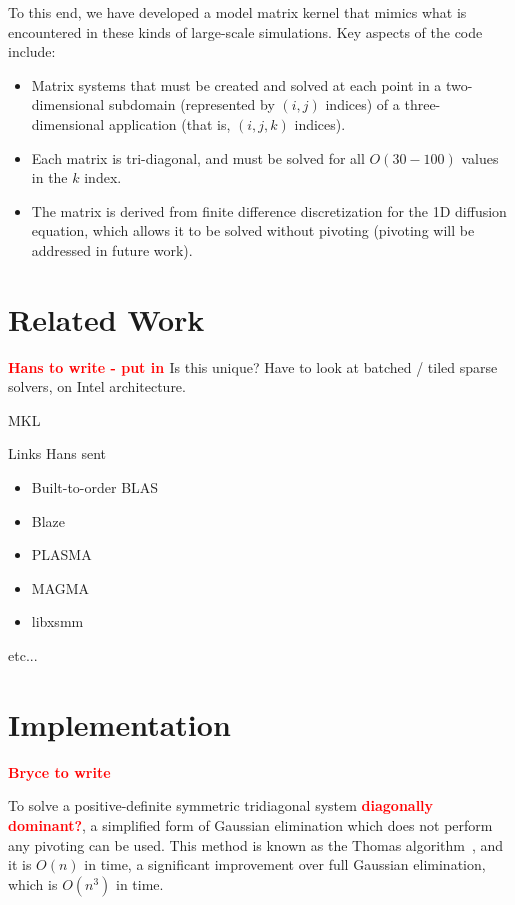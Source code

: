 \documentclass[conference]{IEEEtran}
\newcommand{\fix}[1]{{\bf \textcolor {red}{#1}}}
\begin{document}
To this end, we have developed a model matrix kernel that mimics what
  is encountered in these kinds of large-scale simulations.
Key aspects of the code include:
\begin{itemize}
\item Matrix systems that must be created and solved
  at each point in a two-dimensional subdomain (represented by $(i,j)$ indices)
  of a three-dimensional application (that is, $(i,j,k)$ indices).
\item Each matrix is tri-diagonal, and must be solved for all $O(30-100)$
  values in the $k$ index.
\item The matrix is derived from finite difference discretization for the
  1D diffusion equation, which allows it to be solved without pivoting
  (pivoting will be addressed in future work).
\end{itemize}

\section{Related Work}
\fix{Hans to write - put in }
Is this unique? Have to look at batched / tiled sparse solvers, on Intel
architecture.

MKL

Links Hans sent
\begin{itemize}
\item Built-to-order BLAS \cite{Spampinato:2014}
\item Blaze \cite{BlazeSite}
\item PLASMA \cite{PLASMASite}
\item MAGMA \cite{Haidar:2015}
\item libxsmm \cite{??}
\end{itemize}


etc...

\section{Implementation}
\fix{Bryce to write}

To solve a positive-definite symmetric tridiagonal system \fix{diagonally
dominant?}, a simplified form of Gaussian elimination which does not perform
any pivoting can be used. This method is known as the Thomas algorithm~\cite{},
and it is \(O(n)\) in time, a significant improvement over full Gaussian
elimination, which is \(O(n^3)\) in time.
\end{document}
